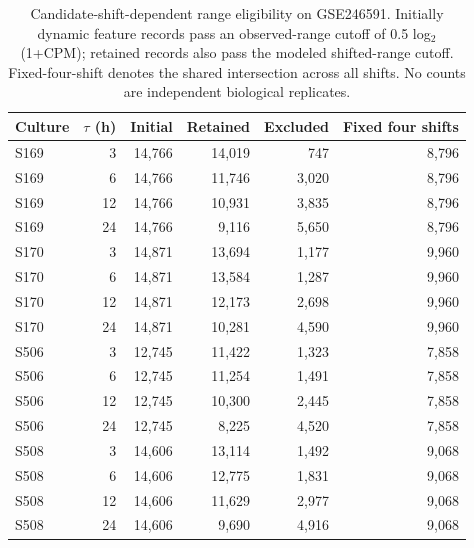 \begin{table}[H]
\centering\small\setlength{\tabcolsep}{4pt}
\caption{Candidate-shift-dependent range eligibility on GSE246591. Initially dynamic feature records pass an observed-range cutoff of 0.5 log$_2$(1+CPM); retained records also pass the modeled shifted-range cutoff. Fixed-four-shift denotes the shared intersection across all shifts. No counts are independent biological replicates.}
\begin{tabular}{@{}lrrrrr@{}}\toprule
Culture & $\tau$ (h) & Initial & Retained & Excluded & Fixed four shifts\\\midrule
S169 & 3 & 14,766 & 14,019 & 747 & 8,796\\
S169 & 6 & 14,766 & 11,746 & 3,020 & 8,796\\
S169 & 12 & 14,766 & 10,931 & 3,835 & 8,796\\
S169 & 24 & 14,766 & 9,116 & 5,650 & 8,796\\
\addlinespace
S170 & 3 & 14,871 & 13,694 & 1,177 & 9,960\\
S170 & 6 & 14,871 & 13,584 & 1,287 & 9,960\\
S170 & 12 & 14,871 & 12,173 & 2,698 & 9,960\\
S170 & 24 & 14,871 & 10,281 & 4,590 & 9,960\\
\addlinespace
S506 & 3 & 12,745 & 11,422 & 1,323 & 7,858\\
S506 & 6 & 12,745 & 11,254 & 1,491 & 7,858\\
S506 & 12 & 12,745 & 10,300 & 2,445 & 7,858\\
S506 & 24 & 12,745 & 8,225 & 4,520 & 7,858\\
\addlinespace
S508 & 3 & 14,606 & 13,114 & 1,492 & 9,068\\
S508 & 6 & 14,606 & 12,775 & 1,831 & 9,068\\
S508 & 12 & 14,606 & 11,629 & 2,977 & 9,068\\
S508 & 24 & 14,606 & 9,690 & 4,916 & 9,068\\
\bottomrule\end{tabular}\label{tab:selection}
\end{table}
